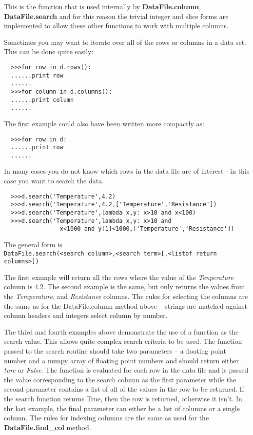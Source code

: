 \documentclass[a4paper,11pt]{scrartcl}
\begin{document}
This is the function that is used internally by \textbf{DataFile.column},
\textbf{DataFile.search} \etc and for this reason the trivial integer and slice
forms are implemented to allow these other functions to work with multiple
columns.

Sometimes you may want to iterate over all of the rows or columns in a data set.
This can be done quite easily:
\begin{verbatim}
  >>>for row in d.rows():
  ......print row
  ......
  >>>for column in d.columns():
  ......print column
  ......
\end{verbatim}
The first example could also have been written more compactly as:
\begin{verbatim}
  >>>for row in d:
  ......print row
  ......
\end{verbatim}

In many cases you do not know which rows in the data file are of interest - in
this case you want to search the data.
\begin{verbatim}
  >>>d.search('Temperature',4.2)
  >>>d.search('Temperature',4.2,['Temperature','Resistance'])
  >>>d.search('Temperature',lambda x,y: x>10 and x<100)
  >>>d.search('Temperature',lambda x,y: x>10 and
                x<1000 and y[1]<1000,['Temperature','Resistance'])
\end{verbatim}
The general form is \\\verb:DataFile.search(<search column>,<search term>[,<listof return columns>]):

The first example will return all the rows where the value of the
\textit{Tenperature} column is 4.2. The second example is the same, but only
returns the values from the \textit{Temperature}, and \textit{Resistance}
columns. The rules for selecting the columns are the same as for the
DataFile.column method above -- strings are matched against column headers and
integers select column by number.

The third and fourth examples above demonstrate the use of a function as the
search value. This allows quite complex search criteria to be used. The function
passed to the search routine should take two parameters -- a floating point
number and a numpy array of floating point numbers and should return either
\textit{ture} or \textit{False}. The function is evaluated for each row in the
data file and is passed the value corresponding to the search column as the
first parameter while the second parameter contains a list of all of the values
in the row to be returned. If the search function returns True, then the row is
returned, otherwise it isn't. In thr last example, the final parameter can
either be a list of columns or a single column. The rules for indexing columns
are the same as used for the \textbf{DataFile.find\_col} method.
\end{document}

